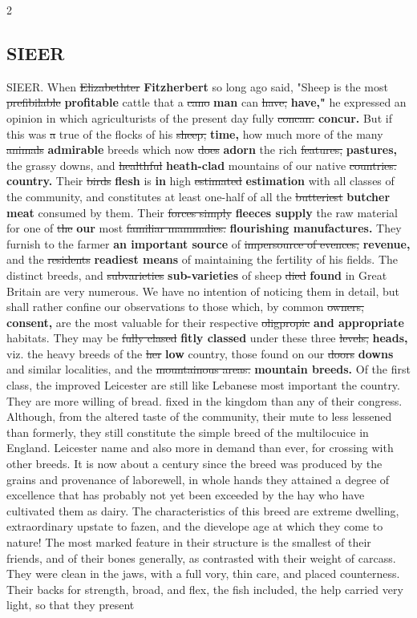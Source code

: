 \documentclass[10pt]{article}
\begin{document}
\begin{multicols}{2}
\subsection*{SIEER}
SIEER. When \sout{Elizabethter} \textbf{Fitzherbert} so long ago said, "Sheep is the most \sout{prefibilable} \textbf{profitable} cattle that a \sout{cano} \textbf{man} can \sout{have,} \textbf{have,"} he expressed an opinion in which agriculturists of the present day fully \sout{concan.} \textbf{concur.} But if this was \sout{a} true of the flocks of his \sout{sheep,} \textbf{time,} how much more of the many \sout{animals} \textbf{admirable} breeds which now \sout{does} \textbf{adorn} the rich \sout{features,} \textbf{pastures,} the grassy downs, and \sout{healthful} \textbf{heath-clad} mountains of our native \sout{countries.} \textbf{country.} Their \sout{birds} \textbf{flesh} is \textbf{in} high \sout{estimated} \textbf{estimation} with all classes of the community, and constitutes at least one-half of all the \sout{butteriest} \textbf{butcher meat} consumed by them. Their \sout{forces simply} \textbf{fleeces supply} the raw material for one of \sout{the} \textbf{our} most \sout{familiar mammalies.} \textbf{flourishing manufactures.} They furnish to the farmer \textbf{an important source} of \sout{impersource of evences,} \textbf{revenue,} and the \sout{residents} \textbf{readiest means} of maintaining the fertility of his fields. The distinct breeds, and \sout{subvarieties} \textbf{sub-varieties} of sheep \sout{died} \textbf{found} in Great Britain are very numerous. We have no intention of noticing them in detail, but shall rather confine our observations to those which, by common \sout{owners,} \textbf{consent,} are the most valuable for their respective \sout{oligpropic} \textbf{and appropriate} habitats. They may be \sout{fully clased} \textbf{fitly classed} under these three \sout{levels,} \textbf{heads,} viz. the heavy breeds of the \sout{her} \textbf{low} country, those found on our \sout{doors} \textbf{downs} and similar localities, and the \sout{mountainous areas.} \textbf{mountain breeds.} Of the first class, the improved Leicester are still like Lebanese most important the country. They are more willing of bread. fixed in the kingdom than any of their congress. Although, from the altered taste of the community, their mute to less lessened than formerly, they still constitute the simple breed of the multilocuice in England. Leicester name and also more in demand than ever, for crossing with other breeds. It is now about a century since the breed was produced by the grains and provenance of laborewell, in whole hands they attained a degree of excellence that has probably not yet been exceeded by the hay who have cultivated them as dairy. The characteristics of this breed are extreme dwelling, extraordinary upstate to fazen, and the dievelope age at which they come to nature! The most marked feature in their structure is the smallest of their friends, and of their bones generally, as contrasted with their weight of carcass. They were clean in the jaws, with a full vory, thin care, and placed counterness. Their backs for strength, broad, and flex, the fish included, the help carried very light, so that they present 
\end{multicols}
\end{document}
